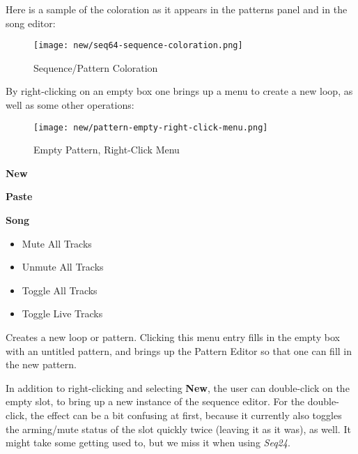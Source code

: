   Here is a sample of the coloration as it appears in the patterns panel and
   in the song editor:

\begin{figure}[H]
   \centering 
   \texttt{[image: new/seq64-sequence-coloration.png]}
   \caption{Sequence/Pattern Coloration}
   \label{fig:pattern_window_sequence_coloration}
\end{figure}

   By right-clicking on an empty box one brings up a menu to create
   a new loop, as well as some other operations:

\begin{figure}[H]
   \centering 
   \texttt{[image: new/pattern-empty-right-click-menu.png]}
   \caption{Empty Pattern, Right-Click Menu}
   \label{fig:pattern_window_empty_right_click}
\end{figure}

   \begin{enumber}
      \item \textbf{New}
      \item \textbf{Paste}
      \item \textbf{Song}
      \begin{itemize}
         \item {Mute All Tracks}
         \item {Unmute All Tracks}
         \item {Toggle All Tracks}
         \item {Toggle Live Tracks}
      \end{itemize}
   \end{enumber}

   \setcounter{ItemCounter}{0}      %

   Creates a new loop or pattern.
   Clicking this menu entry fills in the empty box with an untitled
   pattern, and brings up the Pattern Editor
   so that one can fill in the new pattern.

   In addition to right-clicking and selecting \textbf{New}, the user can
   double-click on the empty slot, to bring up a new instance of the sequence
   editor.  For the double-click, the effect can be a bit confusing at first,
   because it currently also toggles the arming/mute status of the slot
   quickly twice (leaving it as it was), as well.  It might take some getting
   used to, but we miss it when using \textsl{Seq24}.

